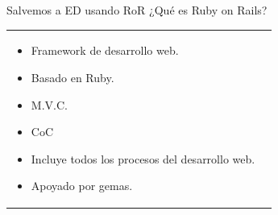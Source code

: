 \begin{frame}{Salvemos a ED usando RoR}
  ¿Qué es Ruby on Rails?
  \begin{tabular}{l c}
    \parbox{0.5\textwidth}{
      \begin{itemize}
        \item Framework de desarrollo web.
        \item Basado en Ruby.
        \item M.V.C.
        \item CoC
        \item Incluye todos los procesos del desarrollo web.
        \item Apoyado por gemas.
      \end{itemize}
    } &
  \end{tabular}
\end{frame}


